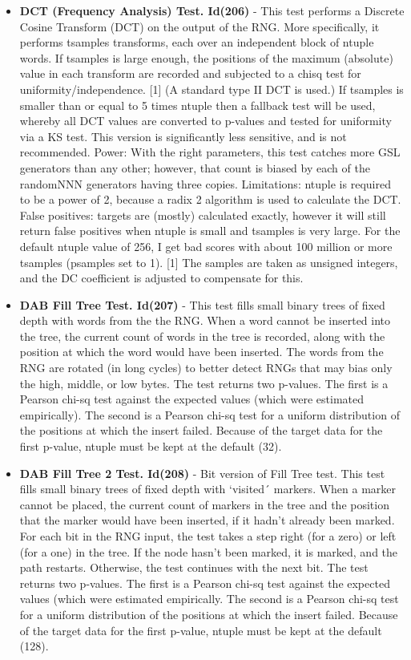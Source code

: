 \begin{itemize}
   \item \textbf{DCT (Frequency Analysis) Test. Id(206)} - This test performs a Discrete Cosine Transform (DCT) on the output of the RNG. More specifically, it performs tsamples transforms, each over an independent block of ntuple words. If tsamples is large enough, the positions of the maximum (absolute) value in each transform are recorded and subjected to a chisq test for uniformity/independence. [1] (A standard type II DCT is used.)  If tsamples is smaller than or equal to 5 times ntuple then a fallback test will be used, whereby all DCT values are converted to p-values and tested for uniformity via a KS test. This version is significantly less sensitive, and is not recommended. Power: With the right parameters, this test catches more GSL generators than any other; however, that count is biased by each of the randomNNN generators having three copies. Limitations: ntuple is required to be a power of 2, because a radix 2 algorithm is used to calculate the DCT. False positives: targets are (mostly) calculated exactly, however it will still return false positives when ntuple is small and tsamples is very large. For the default ntuple value of 256, I get bad scores with about 100 million or more tsamples (psamples set to 1). [1] The samples are taken as unsigned integers, and the DC coefficient is adjusted to compensate for this.
   
   \item \textbf{DAB Fill Tree Test. Id(207)} - This test fills small binary trees of fixed depth with words from the the RNG.  When a word cannot be inserted into the tree, the current count of words in the tree is recorded, along with the position at which the word would have been inserted. The words from the RNG are rotated (in long cycles) to better detect RNGs that may bias only the high, middle, or low bytes. The test returns two p-values.  The first is a Pearson chi-sq test against the expected values (which were estimated empirically).  The second is a Pearson chi-sq test for a uniform distribution of the positions at which the insert failed. Because of the target data for the first p-value, ntuple must be kept at the default (32).
   
   \item \textbf{DAB Fill Tree 2 Test. Id(208)} - Bit version of Fill Tree test. This test fills small binary trees of fixed depth with `visited´ markers.  When a marker cannot be placed, the current count of markers in the tree and the position that the marker would have been inserted, if it hadn't already been marked. For each bit in the RNG input, the test takes a step right (for a zero) or left (for a one) in the tree. If the node hasn't been marked, it is marked, and the path restarts.  Otherwise, the test continues with the next bit. The test returns two p-values.  The first is a Pearson chi-sq test against the expected values (which were estimated empirically.  The second is a Pearson chi-sq test for a uniform distribution of the positions at which the insert failed. Because of the target data for the first p-value, ntuple must be kept at the default (128).
   

\end{itemize}
